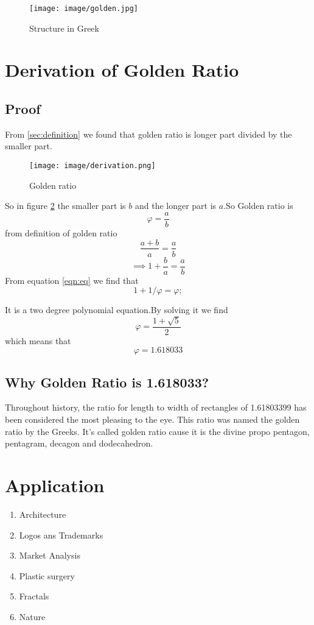 \documentclass{article}
\begin{document}
\begin{figure}[h]
     \centering
      \texttt{[image: image/golden.jpg]}
     \caption{Structure in Greek}
     \label{fig:bl}
 \end{figure}
\section{Derivation of Golden Ratio}
\subsection{Proof}
From \ref{sec:definition} we found that golden ratio is longer part divided by the smaller part.
\begin{figure}[h]
     \centering
      \texttt{[image: image/derivation.png]}
     \caption{Golden ratio}
     \label{fig:bl}
 \end{figure}
 \newline So in figure \ref{fig:bl} the smaller part is $b$ and the longer part is $a$.So Golden ratio is 
 \begin{equation}
     \label{eqn:eq}
     \varphi=\frac{a}{b}
 \end{equation}
 from definition of golden ratio
 \begin{equation}
     \frac{a+b}{a}=\frac{a}{b}
 \end{equation}
 \begin{equation*}
    \implies 1+\frac{b}{a}=\frac{a}{b}
 \end{equation*}
 From equation \ref{eqn:eq} we find that 
 \begin{equation*}
     1+1/\varphi=\varphi;
 \end{equation*}
     
It is a two degree polynomial equation.By solving it we find \newline
\begin{equation*}
    \varphi=\frac{1+\sqrt{5}}{2}
\end{equation*}
which means that \newline
\begin{equation*}
    \varphi=1.618033
\end{equation*}
\subsection{Why Golden Ratio is 1.618033?}
Throughout  history, the ratio for length to width of rectangles of 1.61803399 has been considered the most pleasing to the eye. This ratio  was named the golden ratio by the Greeks.\newline
It's called golden ratio cause it is the divine propo pentagon, pentagram, decagon and dodecahedron. 
\section{Application}
 \begin{enumerate}
     \item Architecture
     \item Logos ans Trademarks
     \item Market Analysis
   \item  Plastic surgery
   \item Fractals
   \item Nature
 \end{enumerate}
 
     
\end{document}
